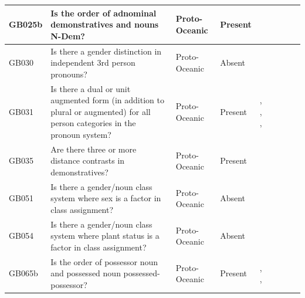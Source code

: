 \documentclass[draft,10pt]{article} %
\begin{document}
\begin{landscape}
\begin{longtable}{| p{2cm}| p{3cm}| p{2.5cm}|p{2cm}|p{2cm}|p{2cm}|p{2cm}|p{2cm}|p{2cm}|}
GB025b&Is the order of adnominal demonstratives and nouns N-Dem?&Proto-Oceanic&Present&\citet[72]{lynchrosscrowley_proto_grammar_oceanic}& \cellcolor{hedvig_lightgreen!50}{True Positive} & \cellcolor{hedvig_yellow!50}{Half} & \cellcolor{hedvig_lightgreen!50}{True Positive} & \cellcolor{hedvig_yellow!50}{Half} \\ \hline
GB030&Is there a gender distinction in independent 3rd person pronouns?&Proto-Oceanic&Absent&\citet[498]{ross2004morphosyntactic}& \cellcolor{hedvig_lightgreen!50}{True Negative} & \cellcolor{hedvig_yellow!50}{Half} & \cellcolor{hedvig_yellow!50}{True Negative} & \cellcolor{hedvig_yellow!50}{Half} \\ \hline
GB031&Is there a dual or unit augmented form (in addition to plural or augmented) for all person categories in the pronoun system?&Proto-Oceanic&Present&\citet[498]{ross2004morphosyntactic}, \citet[109]{kikusawa2001rotuman}, \citet[69]{lynchrosscrowley_proto_grammar_oceanic}, \citet[173]{pawley1973some}& \cellcolor{hedvig_lightgreen!50}{True Positive} & \cellcolor{hedvig_yellow!50}{Half} & \cellcolor{hedvig_lightgreen!50}{True Positive} & \cellcolor{hedvig_yellow!50}{Half} \\ \hline
GB035&Are there three or more distance contrasts in demonstratives?&Proto-Oceanic&Present&\citet[72]{lynchrosscrowley_proto_grammar_oceanic}& \cellcolor{hedvig_lightgreen!50}{True Positive} & \cellcolor{hedvig_yellow!50}{Half} & \cellcolor{hedvig_lightgreen!50}{True Positive} & \cellcolor{hedvig_yellow!50}{False Negative} \\ \hline
GB051&Is there a gender/noun class system where sex is a factor in class assignment?&Proto-Oceanic&Absent&\citet[498]{ross2004morphosyntactic}& \cellcolor{hedvig_lightgreen!50}{True Negative} & \cellcolor{hedvig_yellow!50}{Half} & \cellcolor{hedvig_yellow!50}{True Negative} & \cellcolor{hedvig_red!50}{False Positive} \\ \hline
GB054&Is there a gender/noun class system where plant status is a factor in class assignment?&Proto-Oceanic&Absent&\citet[498]{ross2004morphosyntactic}& \cellcolor{hedvig_lightgreen!50}{True Negative} & \cellcolor{hedvig_yellow!50}{Half} & \cellcolor{hedvig_yellow!50}{True Negative} & \cellcolor{hedvig_yellow!50}{Half} \\ \hline
GB065b&Is the order of possessor noun and possessed noun possessed-possessor?&Proto-Oceanic&Present&\citet[155-156]{pawley1973some}, \citet[512]{ross2004morphosyntactic}, \citet[77]{lynchrosscrowley_proto_grammar_oceanic}& \cellcolor{hedvig_lightgreen!50}{True Positive} & \cellcolor{hedvig_yellow!50}{Half} & \cellcolor{hedvig_lightgreen!50}{True Positive} & \cellcolor{hedvig_yellow!50}{Half} \\ \hline

\end{longtable}
\end{landscape}
\end{document}
